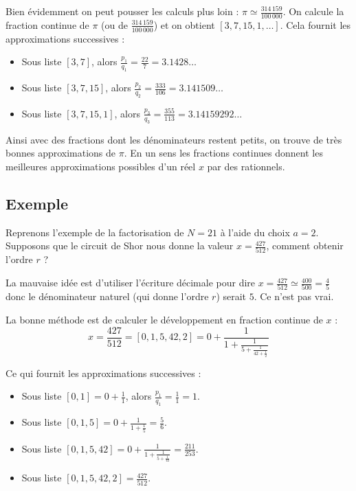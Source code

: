 \documentclass[11pt,class=report,crop=false]{standalone}
\begin{document}
Bien évidemment on peut pousser les calculs plus loin :
$\pi \simeq \frac{314\,159}{100\,000}$.
On calcule la fraction continue de $\pi$ (ou de $\frac{314\,159}{100\,000}$) et on obtient $[3, 7, 15, 1,\ldots]$. Cela fournit les approximations successives :
\begin{itemize}
  \item Sous liste $[3,7]$, alors $\frac{p_1}{q_1} = \frac{22}{7}= 3.1428\ldots$
  \item Sous liste $[3,7,15]$, alors $\frac{p_2}{q_2} = \frac{333}{106}= 3.141509\ldots$
  \item Sous liste $[3,7,15,1]$, alors $\frac{p_3}{q_3} = \frac{355}{113}= 3.14159292\ldots$
\end{itemize}

Ainsi avec des fractions dont les dénominateurs restent petits, on trouve de très bonnes approximations de $\pi$.
En un sens les fractions continues donnent les meilleures approximations possibles d'un réel $x$ par des rationnels.

\subsection{Exemple}

Reprenons l'exemple de la factorisation de $N=21$ à l'aide du choix $a=2$.
Supposons que le circuit de Shor nous donne la valeur $x = \frac{427}{512}$,
comment obtenir l'ordre $r$ ?

La mauvaise idée est d'utiliser l'écriture décimale pour dire $x = \frac{427}{512} \simeq \frac{400}{500} = \frac45$ donc le dénominateur naturel (qui donne l'ordre $r$) serait $5$. Ce n'est pas vrai.

La bonne méthode est de calculer le développement en fraction continue de $x$ :
$$
x 
= \frac{427}{512} 
= [0,1,5,42,2] 
= 0 + \frac{1}{1 + \frac{1}{5 + \frac{1}{42 + \frac12}}}
$$

Ce qui fournit les approximations successives :
\begin{itemize}
  \item Sous liste $[0,1] = 0+\frac11$, alors $\frac{p_1}{q_1} = \frac{1}{1} = 1$.
  \item Sous liste $[0,1,5] = 0+\frac{1}{1+\frac15}=\frac56$.
  \item Sous liste $[0,1,5,42] = 0+\frac{1}{1+\frac{1}{5+\frac1{42}}}=\frac{211}{253}$.
  \item Sous liste $[0,1,5,42,2] = \frac{427}{512}$.
\end{itemize}
\end{document}
